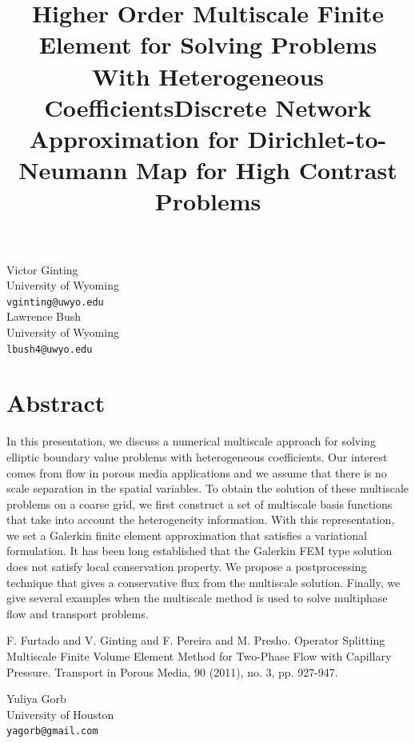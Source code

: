 \documentclass[article,A4,11pt]{llncs}%
\begin{document}
\title{Higher Order Multiscale Finite Element for Solving Problems With Heterogeneous Coefficients}
 \author{} \institute{}
\maketitle
\begin{center}
{\large Victor Ginting}\\
University of Wyoming\\
{\tt vginting@uwyo.edu}
\\ \vspace{4mm}
{\large Lawrence  Bush}\\
University of Wyoming\\
{\tt lbush4@uwyo.edu}
\end{center}

\section*{Abstract}
In this presentation, we discuss a numerical multiscale approach for solving elliptic boundary value problems with heterogeneous coefficients. Our interest comes from flow in porous media applications and we assume that there is no scale separation in the spatial variables. To obtain the solution of these multiscale problems on a coarse grid, we first construct a set of multiscale basis functions that take into account the heterogeneity information. With this representation, we set a Galerkin finite element approximation that satisfies a variational formulation. It has been long established that the Galerkin FEM type solution does not satisfy local conservation property. We propose a postprocessing technique that gives a conservative flux from the multiscale solution. Finally, we give several examples when the multiscale method is used to solve multiphase flow and transport problems. 


\begin{thebibliography}{10}
{\sc F. Furtado and V. Ginting and F. Pereira and M. Presho}. {Operator Splitting Multiscale Finite Volume Element Method for Two-Phase Flow with Capillary Pressure}. Transport in Porous Media, 90 (2011), no. 3, pp. 927-947.
\end{thebibliography}

\title{Discrete Network Approximation for Dirichlet-to-Neumann Map for High Contrast Problems}
 \author{} \institute{}
\maketitle
\begin{center}
{\large Yuliya Gorb}\\
University of Houston\\
{\tt yagorb@gmail.com}
\end{center}
\end{document}
